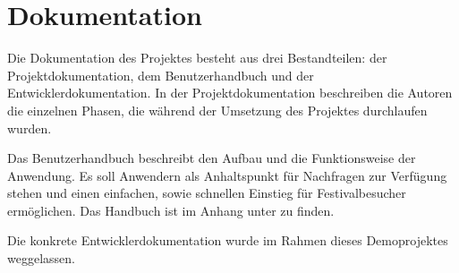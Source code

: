 \section{Dokumentation}
\label{sec:Dokumentation}
Die Dokumentation des Projektes besteht aus drei Bestandteilen: der Projektdokumentation, dem Benutzerhandbuch und der Entwicklerdokumentation. In der Projektdokumentation
beschreiben die Autoren die einzelnen Phasen, die während der Umsetzung des Projektes durchlaufen wurden.

Das Benutzerhandbuch beschreibt den Aufbau und die Funktionsweise der Anwendung. Es soll Anwendern als Anhaltspunkt für Nachfragen zur Verfügung stehen und einen einfachen,
sowie schnellen Einstieg für Festivalbesucher ermöglichen. Das Handbuch ist im Anhang unter  zu finden.

Die konkrete Entwicklerdokumentation wurde im Rahmen dieses Demoprojektes weggelassen.